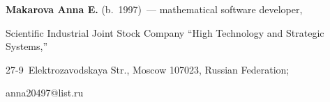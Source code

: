   


  \noindent


  \textbf{Makarova Anna E.} (b.\ 1997)~--- mathematical software developer, 


Scientific Industrial Joint Stock Company ``High Technology and Strategic Systems,'' 


\mbox{27-9}~Elektrozavodskaya Str., Moscow 107023, Russian Federation; 


\mbox{anna20497@list.ru}


  


  


\label{end\stat}





\renewcommand{\bibname}{\protect\rm Литература} 





  


